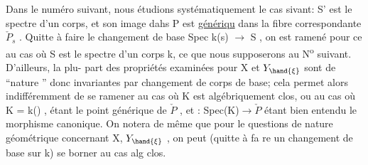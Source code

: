Dans le numéro suivant, nous étudions systématiquement le cas
sivant: S' est le spectre d'un corps, et son image dahs P est \uline{génériqu}
dans la fibre correspondante $\check{P}_s$ . Quitte à faire le changement de base
Spec k(s) $\longrightarrow$ S , on est ramené pour ce au cas où S est le spectre
d'un corps k, ce que nous supposerons au N\textsuperscript{o} suivant. D'ailleurs, la plu-%
part des propriétés examinées pour X et $Y_{\hand{\xi}}$ sont de ``nature ''
donc invariantes par changement de corps de base; cela permet alors
indifféremment de se ramener au cas où K est algébriquement clos, ou au
cas où K = k(\hand{$\eta$}) , \hand{$\eta$} étant le point générique de $\check{P}$ , et \hand{$\xi$} : Spec(K)$\to\check{P}$
étant bien entendu le morphisme canonique. On notera de même que pour le
questions de nature géométrique concernant X, $Y_{\hand{\xi}}$ , on peut (quitte à fa
re un changement de base sur k) se borner au cas  alg clos.

